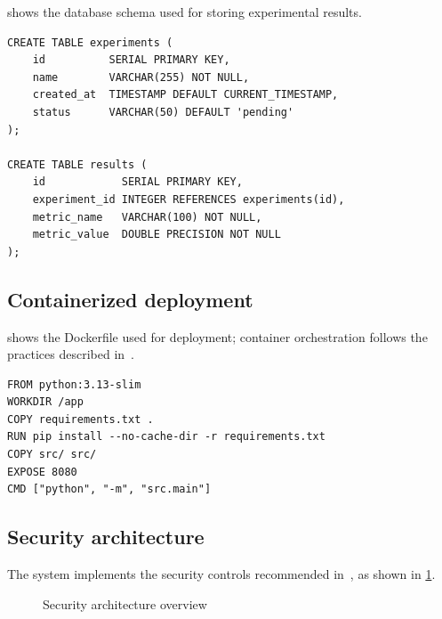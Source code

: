  shows the database schema used for storing experimental results.

\begin{codelisting}[htbp]
  \caption{Database schema (schema.sql)}\label{lst:sql}
\begin{verbatim}
CREATE TABLE experiments (
    id          SERIAL PRIMARY KEY,
    name        VARCHAR(255) NOT NULL,
    created_at  TIMESTAMP DEFAULT CURRENT_TIMESTAMP,
    status      VARCHAR(50) DEFAULT 'pending'
);

CREATE TABLE results (
    id            SERIAL PRIMARY KEY,
    experiment_id INTEGER REFERENCES experiments(id),
    metric_name   VARCHAR(100) NOT NULL,
    metric_value  DOUBLE PRECISION NOT NULL
);
\end{verbatim}
\end{codelisting}

\subsection{Containerized deployment}

 shows the Dockerfile used for deployment; container orchestration follows the practices described in~\cite{burns2016borg}.

\begin{codelisting}[htbp]
  \caption{Application Dockerfile}\label{lst:dockerfile}
\begin{verbatim}
FROM python:3.13-slim
WORKDIR /app
COPY requirements.txt .
RUN pip install --no-cache-dir -r requirements.txt
COPY src/ src/
EXPOSE 8080
CMD ["python", "-m", "src.main"]
\end{verbatim}
\end{codelisting}

\subsection{Security architecture}

The system implements the security controls recommended in~\cite{nist2020sp80053}, as shown in \cref{fig:security}.

\begin{figure}[htbp]
  \centering
  \caption{Security architecture overview}\label{fig:security}
\end{figure}
